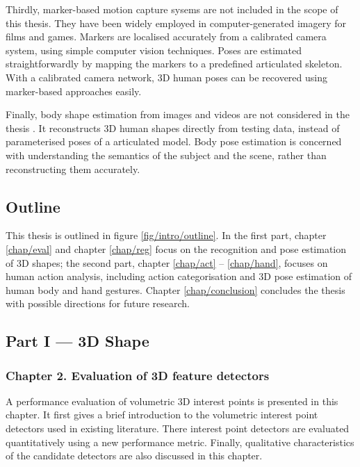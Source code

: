 Thirdly, marker-based motion capture sysems are not included in the scope of this thesis. They have been widely employed in computer-generated imagery for films and games. Markers are localised accurately from a calibrated camera system, using simple computer vision techniques. Poses are estimated straightforwardly by mapping the markers to a predefined articulated skeleton.
 With a calibrated camera network, 3D human poses can be recovered using marker-based approaches easily.  

Finally, body shape estimation from images and videos are not considered in the thesis \cite{Guan2009, Rother2009, Chen2011}. It reconstructs 3D human shapes directly from testing data, instead of parameterised poses of a articulated model. Body pose estimation is concerned with understanding the semantics of the subject and the scene, rather than reconstructing them accurately. 

\subsection{Outline}

This thesis is outlined in figure \ref{fig/intro/outline}. In the first part, chapter \ref{chap/eval} and chapter \ref{chap/reg} focus on the recognition and pose estimation of 3D shapes; the second part, chapter \ref{chap/act} -- \ref{chap/hand}, focuses on human action analysis, including action categorisation and 3D pose estimation of human body and hand gestures. Chapter \ref{chap/conclusion} concludes the thesis with possible directions for future research. 

\subsection*{Part I --- 3D Shape}


\subsubsection*{Chapter 2. Evaluation of 3D feature detectors} 
A performance evaluation of volumetric 3D interest points is presented in this chapter. 
It first gives a brief introduction to the volumetric interest point detectors used in existing literature.
There interest point detectors are evaluated quantitatively using a new performance metric.
Finally, qualitative characteristics of the candidate detectors are also discussed in this chapter. 

